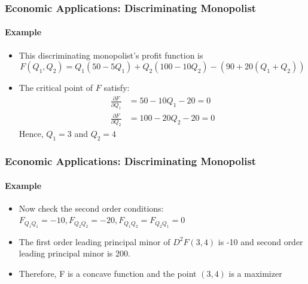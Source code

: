 \documentclass[9pt,aspectratio=169]{beamer}
\begin{document}
\begin{frame}
    \frametitle{Economic Applications: Discriminating Monopolist}
    \framesubtitle{Example}
    \begin{itemize}
		\item This discriminating monopolist’s profit function is 
		\begin{equation*}
            F(Q_1,Q_2) = Q_1(50-5Q_1)+Q_2(100-10Q_2) - (90+20(Q_1+Q_2))
		\end{equation*}
        \item The critical point of $F$ satisfy: 
        \begin{align*}
            \frac{\partial F}{\partial Q_1} &= 50-10Q_1-20 = 0 \\
            \frac{\partial F}{\partial Q_2} &= 100-20Q_2-20 = 0 
        \end{align*}
        Hence, $Q_1 = 3$ and $Q_2 = 4$
    \end{itemize}
\end{frame}


\begin{frame}
    \frametitle{Economic Applications: Discriminating Monopolist}
    \framesubtitle{Example}
	\begin{itemize}
		\item Now check the second order conditions: $F_{Q_1Q_1} = -10,
        F_{Q_2Q_2} = -20, F_{Q_1Q_2} = F_{Q_2Q_1} = 0$
		\item The first order leading principal minor of $D^2F(3,4)$ is -10
        and second order leading principal minor is 200.
		\item Therefore, F is a concave function and the point $(3, 4)$ is a
        maximizer
	\end{itemize}
\end{frame}
\end{document}

